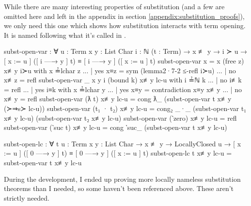 While there are many interesting properties of substitution (and a few are omitted here and left in
the appendix in section \ref{appendix:substitution_proofs}), we only need this one which shows how
substitution interacts with term opening. It is named following what it's called in
\citet{chargueraud_locally_2012}.
\begin{code}
  subst-open-var : ∀ {u : Term} {x y : List Char} {i : ℕ} (t : Term)
    → x ≢ y
    → i ≻ u
    → [ x := u ] ([ i —→ y ] t) ≡ [ i —→ y ] ([ x := u ] t)
  subst-open-var {x = x} (free z) x≢y i≻u with x ≟lchar z
  ... | yes x≡z = sym (lemma2·7-2 ≤-refl i≻u)
  ... | no  x≢z = refl
  subst-open-var {_} {x} {y} {i} (bound k) x≢y lc-u with i ≟ℕ k
  ... | no  i≢k = refl
  ... | yes i≡k with x ≟lchar y
  ...   | yes x≡y = contradiction x≡y x≢y
  ...   | no  x≢y = refl
  subst-open-var (ƛ t) x≢y lc-u =
    cong ƛ_ (subst-open-var t x≢y (≻⇒s≻ lc-u))
  subst-open-var (t₁ · t₂) x≢y lc-u =
    cong₂ _·_
      (subst-open-var t₁ x≢y lc-u)
      (subst-open-var t₂ x≢y lc-u)
  subst-open-var (‵zero) x≢y lc-u = refl
  subst-open-var (‵suc t) x≢y lc-u =
    cong ‵suc_ (subst-open-var t x≢y lc-u)

  subst-open-lc : ∀ {t u : Term} {x y : List Char}
    → x ≢ y
    → LocallyClosed u
    → [ x := u ] ([ 0 —→ y ] t) ≡ [ 0 —→ y ] ([ x := u ] t)
  subst-open-lc {t} x≢y lc-u = subst-open-var t x≢y lc-u
\end{code}

During the development, I ended up proving more locally nameless substitution theorems than I
needed, so some haven't been referenced above. These aren't strictly needed.

